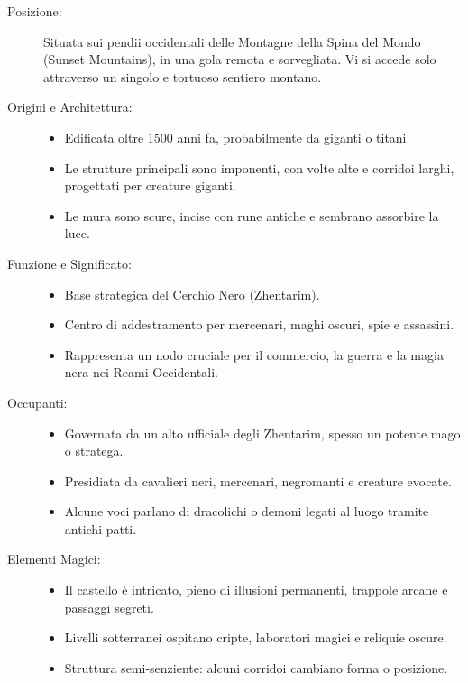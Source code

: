 \documentclass{article}
\begin{document}
 \begin{description}

  \item[Posizione:]
  Situata sui pendii occidentali delle Montagne della Spina del Mondo (Sunset Mountains), in una gola remota e sorvegliata. Vi si accede solo attraverso un singolo e tortuoso sentiero montano.

  \item[Origini e Architettura:]
  \begin{itemize}
    \item Edificata oltre 1500 anni fa, probabilmente da giganti o titani.
    \item Le strutture principali sono imponenti, con volte alte e corridoi larghi, progettati per creature giganti.
    \item Le mura sono scure, incise con rune antiche e sembrano assorbire la luce.
  \end{itemize}

  \item[Funzione e Significato:]
  \begin{itemize}
    \item Base strategica del Cerchio Nero (Zhentarim).
    \item Centro di addestramento per mercenari, maghi oscuri, spie e assassini.
    \item Rappresenta un nodo cruciale per il commercio, la guerra e la magia nera nei Reami Occidentali.
  \end{itemize}

  \item[Occupanti:]
  \begin{itemize}
    \item Governata da un alto ufficiale degli Zhentarim, spesso un potente mago o stratega.
    \item Presidiata da cavalieri neri, mercenari, negromanti e creature evocate.
    \item Alcune voci parlano di dracolichi o demoni legati al luogo tramite antichi patti.
  \end{itemize}

  \item[Elementi Magici:]
  \begin{itemize}
    \item Il castello è intricato, pieno di illusioni permanenti, trappole arcane e passaggi segreti.
    \item Livelli sotterranei ospitano cripte, laboratori magici e reliquie oscure.
    \item Struttura semi-senziente: alcuni corridoi cambiano forma o posizione.
  \end{itemize}


\end{description}
\end{document}
